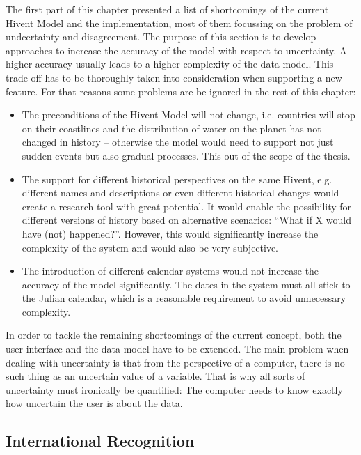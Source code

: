 The first part of this chapter presented a list of shortcomings of the current Hivent Model and the implementation, most of them focussing on the problem of undcertainty and disagreement. The purpose of this section is to develop approaches to increase the accuracy of the model with respect to uncertainty. A higher accuracy usually leads to a higher complexity of the data model. This trade-off has to be thoroughly taken into consideration when supporting a new feature. For that reasons some problems are be ignored in the rest of this chapter:

\begin{itemize}
  \item The preconditions of the Hivent Model will not change, i.e. countries will stop on their coastlines and the distribution of water on the planet has not changed in history -- otherwise the model would need to support not just sudden events but also gradual processes. This out of the scope of the thesis.
  \item The support for different historical perspectives on the same Hivent, e.g. different names and descriptions or even different historical changes would create a research tool with great potential. It would enable the possibility for different versions of history based on alternative scenarios: ``What if X would have (not) happened?''. However, this would significantly increase the complexity of the system and would also be very subjective.
  \item The introduction of different calendar systems would not increase the accuracy of the model significantly. The dates in the system must all stick to the Julian calendar, which is a reasonable requirement to avoid unnecessary complexity.
\end{itemize}

In order to tackle the remaining shortcomings of the current concept, both the user interface and the data model have to be extended. The main problem when dealing with uncertainty is that from the perspective of a computer, there is no such thing as an uncertain value of a variable. That is why all sorts of uncertainty must ironically be quantified: The computer needs to know exactly how uncertain the user is about the data.

\subsection{International Recognition} %
\label{sub:international_recognition}

